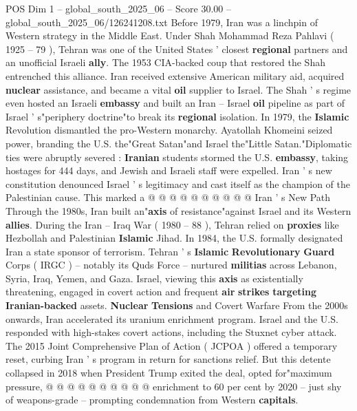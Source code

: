 \begin{textsample}{POS Dim 1 – global\_south\_2025\_06 – Score 30.00 – global\_south\_2025\_06/126241208.txt}  \label{ex:f1_pos_211}
Before 1979, Iran was a linchpin of Western strategy in the Middle East.
Under Shah Mohammad Reza Pahlavi ( 1925 -- 79 ), Tehran was one of the United States ' closest \textbf{regional} partners and an unofficial Israeli \textbf{ally}.
The 1953 CIA-backed coup that restored the Shah entrenched this alliance.
Iran received extensive American military aid, acquired \textbf{nuclear} assistance, and became a vital \textbf{oil} supplier to Israel.
The Shah ' s regime even hosted an Israeli \textbf{embassy} and built an Iran -- Israel \textbf{oil} pipeline as part of Israel ' s"periphery doctrine"to break its \textbf{regional} isolation.
In 1979, the \textbf{Islamic} Revolution dismantled the pro-Western monarchy.
Ayatollah Khomeini seized power, branding the U.S. the"Great Satan"and Israel the"Little Satan."Diplomatic ties were abruptly severed : \textbf{Iranian} students stormed the U.S. \textbf{embassy}, taking hostages for 444 days, and Jewish and Israeli staff were expelled.
Iran ' s new constitution denounced Israel ' s legitimacy and cast itself as the champion of the Palestinian cause.
This marked a @ @ @ @ @ @ @ @ @ @ Iran ' s New Path Through the 1980s, Iran built an"\textbf{axis} of resistance"against Israel and its Western \textbf{allies}.
During the Iran -- Iraq War ( 1980 -- 88 ), Tehran relied on \textbf{proxies} like Hezbollah and Palestinian \textbf{Islamic} Jihad.
In 1984, the U.S. formally designated Iran a state sponsor of terrorism.
Tehran ' s \textbf{Islamic} \textbf{Revolutionary} \textbf{Guard} Corps ( IRGC ) -- notably its Quds Force -- nurtured \textbf{militias} across Lebanon, Syria, Iraq, Yemen, and Gaza.
Israel, viewing this \textbf{axis} as existentially threatening, engaged in covert action and frequent \textbf{air} \textbf{strikes} \textbf{targeting} \textbf{Iranian-backed} assets. \textbf{Nuclear} \textbf{Tensions} and Covert Warfare From the 2000s onwards, Iran accelerated its uranium enrichment program.
Israel and the U.S. responded with high-stakes covert actions, including the Stuxnet cyber attack.
The 2015 Joint Comprehensive Plan of Action ( JCPOA ) offered a temporary reset, curbing Iran ' s program in return for sanctions relief.
But this detente collapsed in 2018 when President Trump exited the deal, opted for"maximum pressure, @ @ @ @ @ @ @ @ @ @ enrichment to 60 per cent by 2020 -- just shy of weapons-grade -- prompting condemnation from Western \textbf{capitals}.

\end{textsample}
